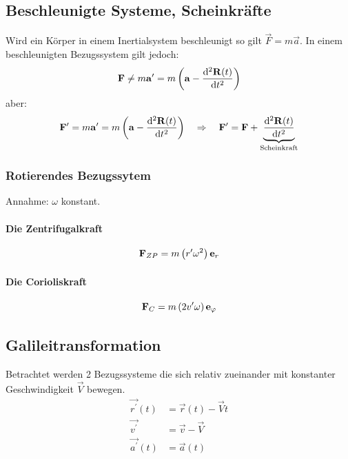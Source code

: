 \subsection{Beschleunigte Systeme, Scheinkräfte}
Wird ein Körper in einem Inertialsystem beschleunigt so gilt $\vec{F} = m \vec{a}$. In einem beschleunigten Bezugssystem gilt jedoch:
\begin{equation}
\mathbf{F} \neq m \mathbf{a^\prime} = m \left( \mathbf{a} - \frac{\mathrm d^2 \mathbf{R}(t)}{\mathrm d t^2} \right)
\end{equation}
aber:
\begin{equation}
\mathbf{F^\prime} = m \mathbf{a^\prime} = m \left( \mathbf{a} - \frac{\mathrm d^2 \mathbf{R}(t)}{\mathrm d t^2} \right) \quad\Rightarrow\quad \mathbf{F^\prime} = \mathbf{F} + \underbrace{\frac{\mathrm d^2 \mathbf{R}(t)}{\mathrm d t^2}}_{\text{Scheinkraft}}
\end{equation}
\subsubsection{Rotierendes Bezugssytem}
Annahme: $\omega$ konstant. 
\paragraph{Die Zentrifugalkraft}
\begin{equation}
\mathbf{F}_{ZP} = m \left(r^\prime \omega ^2 \right) \mathbf{e}_{r}
\end{equation}
\paragraph{Die Corioliskraft}
\begin{equation}
\mathbf{F}_{C} = m \left(2 v^\prime \omega \right) \mathbf{e}_{\varphi}
\end{equation}
\subsection{Galileitransformation}
Betrachtet werden 2 Bezugssysteme die sich relativ zueinander mit konstanter Geschwindigkeit $\vec{V}$ bewegen.
\begin{align}
\vec{r^\prime}(t) &= \vec{r} (t) - \vec{V} t \\
\vec{v^\prime} &= \vec{v} - \vec{V} \\
\vec{a^\prime}(t) &= \vec{a}(t)
\end{align}
